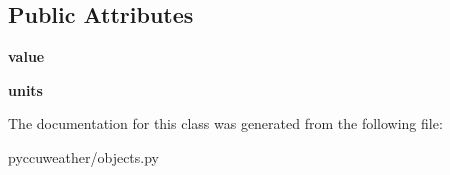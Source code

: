 \subsection*{Public Attributes}
\begin{DoxyCompactItemize}
\item 
\hypertarget{classpyccuweather_1_1objects_1_1_ceiling_a4dd120633528b659838eaad3879eb866}{}{\bfseries value}\label{classpyccuweather_1_1objects_1_1_ceiling_a4dd120633528b659838eaad3879eb866}

\item 
\hypertarget{classpyccuweather_1_1objects_1_1_ceiling_a2e1a43e4a01eb4dd8e9478f1db44ae67}{}{\bfseries units}\label{classpyccuweather_1_1objects_1_1_ceiling_a2e1a43e4a01eb4dd8e9478f1db44ae67}

\end{DoxyCompactItemize}


The documentation for this class was generated from the following file\+:\begin{DoxyCompactItemize}
\item 
pyccuweather/objects.\+py\end{DoxyCompactItemize}
